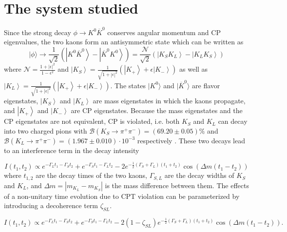 
\section{The system studied}
Since the strong decay $\phi \rightarrow K^0 \overline{K}^0$ conserves angular momentum and CP eigenvalues, the two kaons form an antisymmetric state which can be written as %
\begin{equation}
|\phi\rangle \rightarrow \frac{1}{\sqrt{2}}\left(\left|K^0 \overline{K}^0\right\rangle - \left| \overline{K}^0K^0\right\rangle\right) = \frac{\mathcal{N}}{\sqrt{2}} \left(\left|K_SK_L\right\rangle - \left|K_LK_S\right\rangle\right)
\end{equation}
where $\mathcal{N} = \frac{1+|\epsilon|^2}{1-\epsilon^2}$ and $\left|K_S\right\rangle = \frac{1}{\sqrt{1+|\epsilon|^2}}\left(\left|K_+\right\rangle + \epsilon \left| K_-\right\rangle\right)$ as well as $\left|K_L\right\rangle = \frac{1}{\sqrt{1+|\epsilon|^2}}\left(\left|K_+\right\rangle + \epsilon \left| K_-\right\rangle\right)$. The states $|K^0\rangle$ and $|\overline{K}^0\rangle$ are flavor eigenstates, $\left|K_S\right\rangle$ and $\left|K_L\right\rangle$ are mass eigenstates in which the kaons propagate, and $\left|K_+\right\rangle$ and $\left|K_-\right\rangle$ are CP eigenstates. Because the mass eigenstates and the CP eigenstates are not equivalent, CP is violated, i.e. both $K_S$ and $K_L$ can decay into two charged pions with $\mathcal{B}(K_S \rightarrow \pi^+ \pi^-) = (69.20\pm0.05)\%$ and $\mathcal{B}(K_L \rightarrow \pi^+ \pi^-) = (1.967\pm0.010)\cdot 10^{-3}$ respectively \cite{Agashe:2014kda}.  These two decays lead to an interference term in the decay intensity

\begin{equation}
I(t_1,t_2) \propto  e^{-\Gamma_L t_1 - \Gamma_S t_2} +e^{-\Gamma_S t_1 - \Gamma_L t_2}- 2 e^{-\frac{1}{2}\left(\Gamma_S + \Gamma_L\right)\left(t_1+t_2\right)}\cos\left(\Delta m \left(t_1-t_2\right)\right) \label{EQ:DI1}
\end{equation}
where $t_{1,2}$ are the decay times of the two kaons, $\Gamma_{S,L}$ are the decay widths of $K_S$ and $K_L$, and $\Delta m = \left|m_{K_L} - m_{K_S}\right|$ is the mass difference between them. The effects of a non-unitary time evolution due to CPT violation can be parameterized by introducing a decoherence term $\zeta_{SL}$\cite{Balwierz-Pytko:2013xsa}.

\begin{equation}
I(t_1,t_2) \propto  e^{-\Gamma_L t_1 - \Gamma_S t_2} +e^{-\Gamma_S t_1 - \Gamma_L t_2}- 2(1-\zeta_{SL}) e^{-\frac{1}{2}\left(\Gamma_S + \Gamma_L\right)\left(t_1+t_2\right)}\cos\left(\Delta m \left(t_1-t_2\right)\right). \label{EQ:DI2}
\end{equation}

